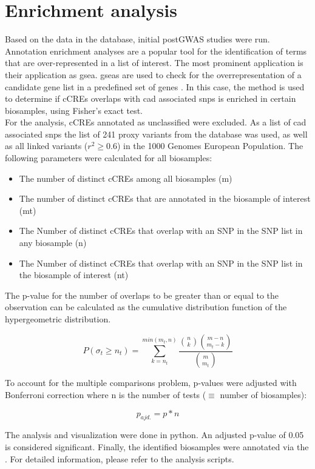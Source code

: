 \section{Enrichment analysis}
\label{sec:enrichment}
Based on the data in the database, initial postGWAS studies were run. Annotation enrichment analyses are a popular tool for the identification of terms that are over-represented in a list of interest. The most prominent application is their application as \ac{gsea}. \Acp{gsea} are used to check for the overrepresentation of a candidate gene list in a predefined set of genes \cite{tipneyIntroductionEffectiveUse2010}. In this case, the method is used to determine if \acp{cCRE} overlaps with \ac{cad} associated \acp{snp} is enriched in certain biosamples, using Fisher's exact test.\\
For the analysis, \acp{cCRE} annotated as unclassified were excluded. As a list of \ac{cad} associated \acp{snp} the list of 241 proxy variants from the database was used, as well as all linked variants ($r^2\geq0.6$) in the 1000 Genomes European Population. The following parameters were calculated for all biosamples:

\begin{itemize}
    \item The number of distinct \acp{cCRE} among all biosamples (m)
    \item The number of distinct \acp{cCRE} that are annotated in the biosample of interest (mt)
    \item The Number of distinct \acp{cCRE} that overlap with an SNP in the SNP list in any biosample (n)
    \item The Number of distinct \acp{cCRE} that overlap with an SNP in the SNP list in the biosample of interest (nt)
\end{itemize}

The p-value for the number of overlaps to be greater than or equal to the observation can be calculated as the cumulative distribution function of the hypergeometric distribution.

$$ P(\sigma_t\geq n_t) = \sum_{k=n_t}^{min(m_t, n)} \frac{\binom{n}{k}\binom{m-n}{m_t-k}}{\binom{m}{m_t}} $$

To account for the multiple comparisons problem, p-values were adjusted with Bonferroni correction where n is the number of tests ($\equiv$ number of biosamples):

$$ p_{ajd.} = p*n$$

The analysis and visualization were done in python. An adjusted p-value of 0.05 is considered significant. Finally, the identified biosamples were annotated via the . For detailed information, please refer to the analysis scripts.

